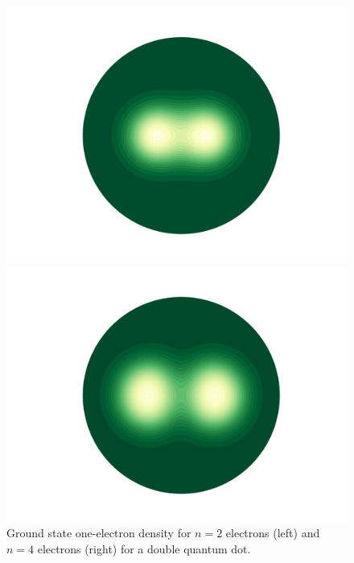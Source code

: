 \begin{figure}
    \centering
    \begin{minipage}{0.49\textwidth}
        \includegraphics[trim=4em 3.5em 4em 4em, clip=true, width=\textwidth]{results/figures/DW/rho_dw.png} 
    \end{minipage}\hfill
    \begin{minipage}{0.49\textwidth}
        \includegraphics[trim=4em 3.5em 4em 4em, clip=true, width=\textwidth]{results/figures/DW/rho_dw_n4.png} 
    \end{minipage}
    \caption{Ground state one-electron density for $n=2$ electrons (left)
        and $n=4$ electrons (right) for a double quantum dot.
    }
    \label{fig:2d_dw_rho}
\end{figure}

